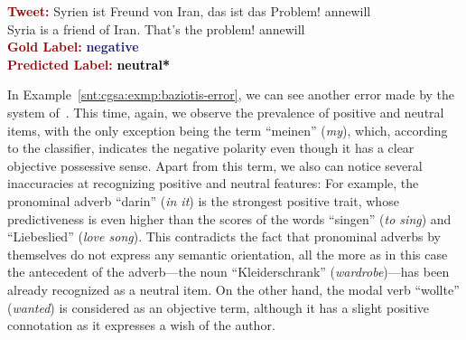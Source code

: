 \begin{example}\label{snt:cgsa:exmp:severyn-error}
  \noindent\textup{\bfseries\textcolor{darkred}{Tweet:}} {\upshape
    \colorbox{white!7.4}{Syrien} \colorbox{green!8}{ist}
    \colorbox{green!11}{Freund} \colorbox{white!6.6}{von}
    \colorbox{white!40.5}{Iran}, das \colorbox{green!8}{ist}
    \colorbox{white!12.7}{das}
    \colorbox{green!1.5}{Problem}\colorbox{green!3}{!}
    \colorbox{blue!0.000005!white!8}{annewill}}\\
  \noindent \colorbox{white!7.4}{Syria} \colorbox{green!8}{is} a \colorbox{green!11}{friend} \colorbox{white!6.6}{of} \colorbox{white!40.5}{Iran}. That\colorbox{green!8}{'s} \colorbox{white!12.7}{the} \colorbox{green!1.5}{problem}\colorbox{green!3}{!} \colorbox{blue!0.000005!white!8}{annewill}\\[\exampleSep]
  \noindent\textup{\bfseries\textcolor{darkred}{Gold Label:}}\hspace*{4.3em}\textbf{%
    \upshape\textcolor{midnightblue}{negative}}\\
 \noindent\textup{\bfseries\textcolor{darkred}{Predicted Label:}}\hspace*{2em}\textbf{%
    \upshape\textcolor{black}{neutral*}}
\end{example}

In Example~\ref{snt:cgsa:exmp:baziotis-error}, we can see another
error made by the system of~\citet{Baziotis:17}.  This time, again, we
observe the prevalence of positive and neutral items, with the only
exception being the term ``meinen'' (\emph{my}), which, according to
the classifier, indicates the negative polarity even though it has a
clear objective possessive sense.  Apart from this term, we also can
notice several inaccuracies at recognizing positive and neutral
features: For example, the pronominal adverb ``darin'' (\emph{in it})
is the strongest positive trait, whose predictiveness is even higher
than the scores of the words ``singen'' (\emph{to sing}) and
``Liebeslied'' (\emph{love song}).  This contradicts the fact that
pronominal adverbs by themselves do not express any semantic
orientation, all the more as in this case the antecedent of the
adverb---the noun ``Kleiderschrank'' (\emph{wardrobe})---has been
already recognized as a neutral item.  On the other hand, the modal
verb ``wollte'' (\emph{wanted}) is considered as an objective term,
although it has a slight positive connotation as it expresses a wish
of the author.

